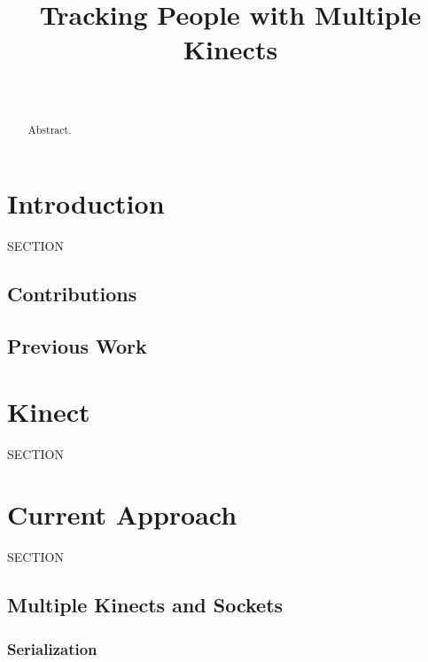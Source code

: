 \documentclass{sigchi}
\begin{document}
\title{Tracking People with Multiple Kinects}

\author{%
  \\
}

\maketitle

\begin{abstract}
Abstract.
\end{abstract}



\section{Introduction}

SECTION

\subsection{Contributions}

\subsection{Previous Work}

\section{Kinect}

SECTION

\section{Current Approach}

SECTION

\subsection{Multiple Kinects and Sockets}

\subsubsection{Serialization}
\end{document}

